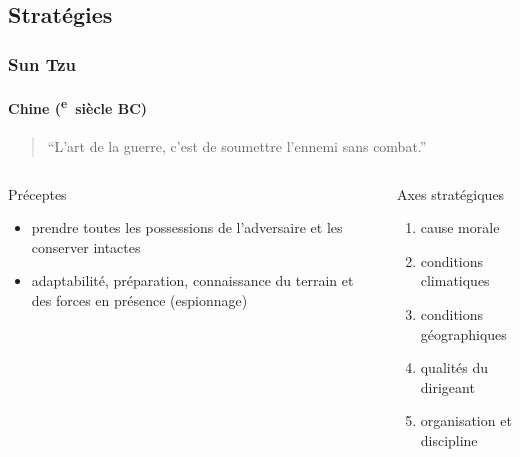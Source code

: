 \documentclass[utf8]{beamer}
\newcommand{\cRM}[1]{\MakeUppercase{\romannumeral #1}}  %
\newcommand{\siecle}[1]{\cRM{#1}\textsuperscript{e}~siècle}
\begin{document}
\subsection{Stratégies}

\begin{frame}
\frametitle{Sun Tzu}
\framesubtitle{Chine (\siecle{6} BC)}
\begin{quote}“L'art de la guerre, c'est de soumettre l'ennemi sans combat.”\end{quote}
\vfill
\begin{columns}[t]
\begin{column}{0.5\linewidth}
Préceptes
\begin{itemize}
\item prendre toutes les possessions de l'adversaire et les conserver intactes
\item adaptabilité, préparation, connaissance du terrain et des forces en présence (espionnage)
\end{itemize}
\end{column}
\begin{column}{0.5\linewidth}
Axes stratégiques
\begin{enumerate}
\item cause morale
\item conditions climatiques
\item conditions géographiques
\item qualités du dirigeant
\item organisation et discipline
\end{enumerate}
\end{column}
\end{columns}

\end{frame}
\end{document}
